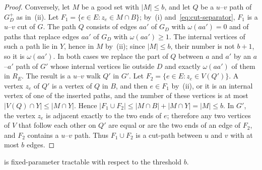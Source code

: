 \begin{proof}
Conversely, let $M$ be a good set with $|M| \leq b$, and let $Q$ be a $u$--$v$ path of $G_D^+$ as in~(ii).
Let $F_1 = \{e \in E : z_e \in M \cap B\}$; by~(i) and~\eqref{eq:cut-separator}, $F_1$ is a $u$--$v$ cut of $G$.
The path $Q$ consists of edges $aa'$ of $G_D$ with $\omega(aa') = 0$ and of paths that replace edges $aa'$ of $G_D$ with $\omega(aa') \geq 1$.
The internal vertices of such a path lie in $Y$, hence in $M$ by~(ii); since $|M| \leq b$, their number is not $b+1$, so it is $\omega(aa')$.
In both cases we replace the part of $Q$ between $a$ and $a'$ by an $a$--$a'$ path of $G'$ whose internal vertices lie outside $D$ and exactly $\omega(aa')$ of them in $R_E$.
The result is a $u$--$v$ walk $Q'$ in $G'$.
Let $F_2 = \{e \in E : z_e \in V(Q')\}$.
A vertex $z_e$ of $Q'$ is a vertex of $Q$ in $B$, and then $e \in F_1$ by~(ii), or it is an internal vertex of one of the inserted paths, and the number of these vertices is at most $|V(Q) \cap Y| \leq |M \cap Y|$.
Hence $|F_1 \cup F_2| \leq |M \cap B| + |M \cap Y| = |M| \leq b$.
In $G'$, the vertex $z_e$ is adjacent exactly to the two ends of $e$; therefore any two vertices of $V$ that follow each other on $Q'$ are equal or are the two ends of an edge of $F_2$, and $F_2$ contains a $u$--$v$ path.
Thus $F_1 \cup F_2$ is a cut-path between $u$ and $v$ with at most $b$ edges.
\end{proof}

\begin{theorem}
\label{thm:fpt}
\MinCutPath{} is fixed-parameter tractable with respect to the threshold $b$.
\end{theorem}

